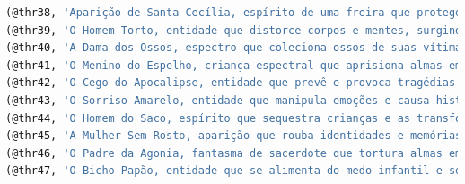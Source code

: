 \documentclass[12pt,a4paper]{report}
\begin{document}
\begin{lstlisting}[language=SQL, caption=population.sql]
(@thr38, 'Aparição de Santa Cecília, espírito de uma freira que protege e pune com milagres e maldições'),
(@thr39, 'O Homem Torto, entidade que distorce corpos e mentes, surgindo em becos escuros'),
(@thr40, 'A Dama dos Ossos, espectro que coleciona ossos de suas vítimas para construir seu corpo'),
(@thr41, 'O Menino do Espelho, criança espectral que aprisiona almas em reflexos'),
(@thr42, 'O Cego do Apocalipse, entidade que prevê e provoca tragédias'),
(@thr43, 'O Sorriso Amarelo, entidade que manipula emoções e causa histeria coletiva'),
(@thr44, 'O Homem do Saco, espírito que sequestra crianças e as transforma em servos espectrais'),
(@thr45, 'A Mulher Sem Rosto, aparição que rouba identidades e memórias'),
(@thr46, 'O Padre da Agonia, fantasma de sacerdote que tortura almas em busca de redenção'),
(@thr47, 'O Bicho-Papão, entidade que se alimenta do medo infantil e se manifesta em pesadelos');


\end{lstlisting}
\end{document}
